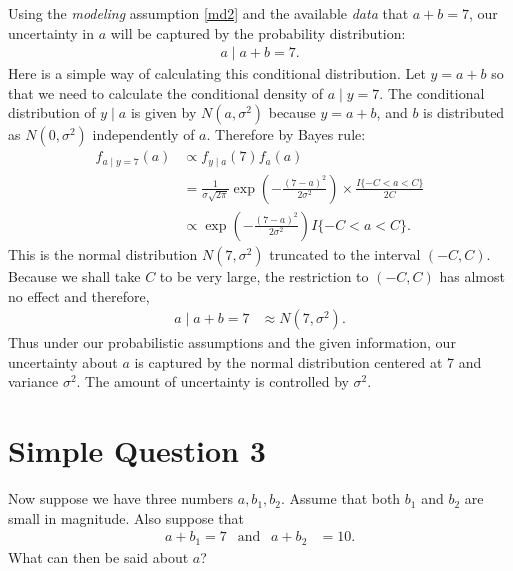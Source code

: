 \documentclass{scrartcl}
\begin{document}
Using the \textit{modeling} assumption \eqref{md2} and the available
\textit{data} that $a + b = 7$, our uncertainty in $a$ will be
captured by the probability distribution:
\begin{align*}
  a \mid a + b = 7. 
\end{align*}
Here is a simple way of calculating this conditional distribution. Let
$y = a + b$ so that we need to calculate the conditional density of $a
\mid y = 7$. The conditional distribution of $y \mid a$ is given by
$N(a, \sigma^2)$ because $y = a + b$,  and $b$ is distributed as $N(0,
\sigma^2)$  independently of $a$. Therefore by Bayes rule:
\begin{align*}
  f_{a \mid y = 7}(a) &\propto f_{y \mid a}(7) f_{a}(a) \\
  &= \frac{1}{\sigma \sqrt{2 \pi}} \exp \left(-\frac{(7 - a)^2}{2
    \sigma^2} \right) \times \frac{I\{-C < a < C\}}{2C} \\
  &\propto \exp \left(-\frac{(7 - a)^2}{2
    \sigma^2} \right) I\{-C < a < C\}. 
\end{align*}
This is the normal distribution $N(7, \sigma^2)$ truncated to the
interval $(-C, C)$. Because we shall take $C$ to be very large, the
restriction to $(-C, C)$ has almost no effect and therefore,
\begin{align*}
  a\mid a+b=7 &\approx N(7,\sigma^2). 
\end{align*}
Thus under our probabilistic assumptions and the given information,
our uncertainty about $a$ is captured by the normal distribution
centered at 7 and variance $\sigma^2$. The amount of uncertainty is
controlled by $\sigma^2$. 

\section{Simple Question 3}

Now suppose we have three numbers $a, b_1, b_2$. Assume that both
$b_1$ and $b_2$ are small in magnitude. Also suppose that 
\begin{align*}
  a+b_1 = 7 ~~ \text{ and } ~~ a+b_2 &= 10. 
\end{align*}
What can then be said about $a$?
\end{document}
